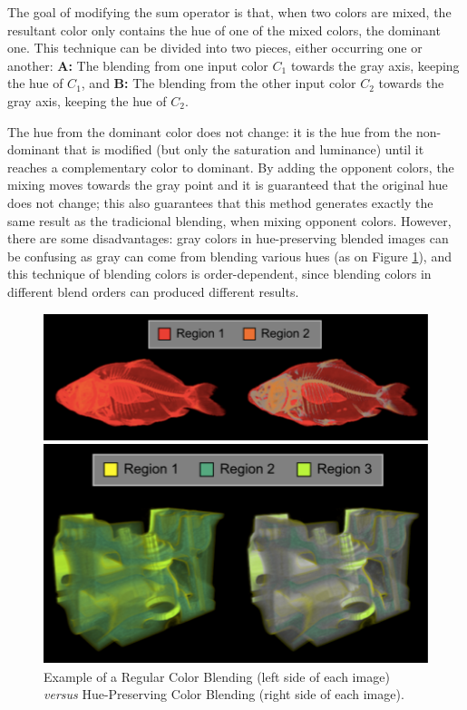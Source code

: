 The goal of modifying the sum operator is that, when two colors are mixed, the resultant color only
contains the hue of one of the mixed colors, the dominant one. This technique can be divided into two
pieces, either occurring one or another: \textbf{A:} The blending from one input color $C_{1}$ towards the gray axis,
keeping the hue of $C_{1}$, and \textbf{B:} The blending from the other input color $C_{2}$ towards the gray axis,
keeping the hue of $C_{2}$. \par
The hue from the dominant color does not change: it is the hue from the non-dominant that is modified
(but only the saturation and luminance) until it reaches a complementary color to dominant. By adding
the opponent colors, the mixing moves towards the gray point and it is guaranteed that the original hue
does not change; this also guarantees that this method generates exactly the same result as the
tradicional blending, when mixing opponent colors.
However, there are some disadvantages: gray colors in hue-preserving blended images can be confusing as
gray can come from blending various hues (as on Figure \ref{fig:examples}), and this technique of blending
colors is order-dependent, since
blending colors in different blend orders can produced different results.
%
\begin{figure}[!h]
  \centering%
  \begin{minipage}{0.3\textwidth}
    \includegraphics[width=\linewidth]{images/background/HuePreserving_3.png}
  \end{minipage}%
  \hspace{0.2\textwidth}%
  \begin{minipage}{0.3\textwidth}\centering
    \includegraphics[width=\linewidth]{images/background/HuePreserving_4.png}
  \end{minipage}%
  \caption[Hue-Preserving Color Blending Examples]{Example of a Regular Color Blending (left side of each image) \emph{versus}
    Hue-Preserving Color Blending (right side of each image). \protect\cite{Chuang2009}}
  \label{fig:examples}
\end{figure}
%
